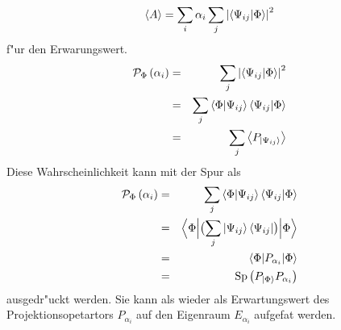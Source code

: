          $$ \left< A \right> = \sum_i \alpha_i \sum_j \left| \left< \Psi_{ij} | \Phi \right> \right|^2 $$
         f"ur den Erwarungswert. 
         \begin{eqnarray*}
            {\cal P}_{\Phi} \left( \alpha_i \right) & = & \sum_j \left| \left< \Psi_{ij} | \Phi \right> \right|^2 \\
                                  & = & \sum_j \left< \Phi | \Psi_{ij} \right>\left< \Psi_{ij} | \Phi \right> \\
                                  & = & \sum_j \left< P_{\left| \Psi_{ij} \right>} \right>
         \end{eqnarray*}
         Diese Wahrscheinlichkeit kann mit der Spur als
         \begin{eqnarray*}
           {\cal P}_{\Phi} \left( \alpha_i \right) & = & \sum_j \left< \Phi | \Psi_{ij} \right>\left< \Psi_{ij} | \Phi \right> \\
                                 & = & \Bigl< \Phi \Big| \bigl( \sum_j \left| \Psi_{ij} \right>\left< \Psi_{ij} \right| \bigr) \Big| \Phi \Bigr> \\
                                 & = & \left< \Phi | P_{\alpha_i} | \Phi \right> \\
                                 & = & \mbox{Sp} \left(  P_{\left| \Phi \right>} P_{\alpha_i} \right)
         \end{eqnarray*}
         ausgedr"uckt werden. Sie kann als wieder als Erwartungswert des Projektionsopetartors $P_{\alpha_i}$ auf den Eigenraum $E_{\alpha_i}$ aufgefa\3t werden.
         
